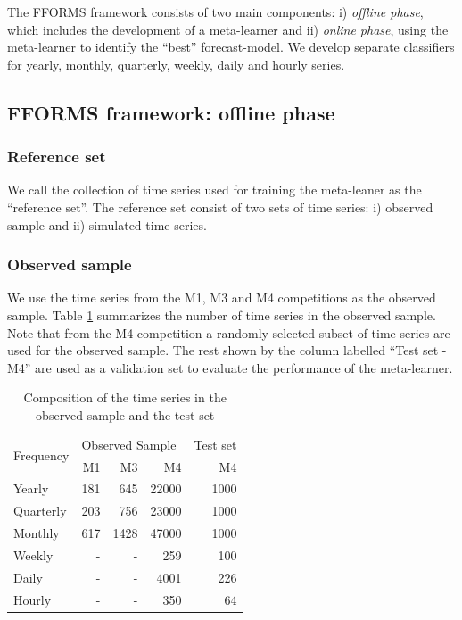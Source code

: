 \documentclass[11pt,a4paper,]{article}
\begin{document}
The FFORMS framework consists of two main components: i) \emph{offline
phase}, which includes the development of a meta-learner and ii)
\emph{online phase}, using the meta-learner to identify the ``best''
forecast-model. We develop separate classifiers for yearly, monthly,
quarterly, weekly, daily and hourly series.

\subsection{FFORMS framework: offline
phase}\label{fforms-framework-offline-phase}

\subsubsection{Reference set}\label{reference-set}

We call the collection of time series used for training the meta-leaner
as the ``reference set''. The reference set consist of two sets of time
series: i) observed sample and ii) simulated time series.

\subsubsection{Observed sample}\label{observed-sample}

We use the time series from the M1, M3 and M4 competitions as the
observed sample. Table \ref{observedsample} summarizes the number of
time series in the observed sample. Note that from the M4 competition a
randomly selected subset of time series are used for the observed
sample. The rest shown by the column labelled ``Test set - M4'' are used
as a validation set to evaluate the performance of the meta-learner.

\begin{table}[!h]
\centering
\caption{Composition of the time series in the observed sample and the test set}
\label{observedsample}
\begin{tabular}{l|rrr|r}
\multirow{2}{*}{Frequency} & \multicolumn{3}{l|}{Observed Sample} & Test set \\
                  &   M1    &    M3   &    M4 & M4 \\ \hline
  Yearly          &   181    &   645    &   22000 & 1000 \\
  Quarterly       &   203    &    756   &   23000 & 1000\\
  Monthly         &   617    &    1428   &  47000 & 1000\\
  Weekly          &   -    &   -    &   259 & 100\\
  Daily           &   -    &   -    &   4001 & 226\\
  Hourly          &   -    &    -   &  350 & 64\\ \hline
\end{tabular}
\end{table}
\end{document}
